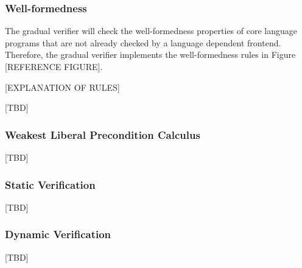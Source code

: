 \documentclass {article}
\begin{document}


\subsubsection{Well-formedness}
The gradual verifier will check the well-formedness properties of core language programs that are not already checked by a language dependent frontend. Therefore, the gradual verifier implements the well-formedness rules in Figure [REFERENCE FIGURE].

[EXPLANATION OF RULES]

[TBD]



\subsubsection{Weakest Liberal Precondition Calculus}
[TBD]

\subsubsection{Static Verification}
[TBD]

\subsubsection{Dynamic Verification}
[TBD]
\end{document}
